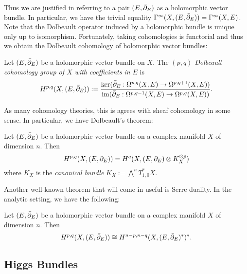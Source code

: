 \documentclass[12pt]{ociamthesis}  %
\begin{document}
Thus we are justified in referring to a pair $(E,{\bar{\partial}}_E)$ as a
holomorphic vector bundle. In particular, we have the trivial
equality $\Gamma^\infty(X,(E,{\bar{\partial}}_E)) = \Gamma^\infty(X,E)$.
Note that the Dolbeault operator induced by a holomorphic bundle is
unique only up to isomorphism. Fortunately, taking cohomologies
is functorial and thus we obtain the Dolbeault cohomology of
holomorphic vector bundles:

\begin{definition}
  Let $(E,{\bar{\partial}}_E)$ be a holomorphic vector bundle on $X$. The
  \emph{$(p,q)$ Dolbeault cohomology group of $X$ with coefficients in
    $E$} is
  \begin{align*}
    H^{p,q}(X,(E,{\bar{\partial}}_E)) := \frac{
      \ker({\bar{\partial}}_E : \Omega^{p,q}(X,E) \to \Omega^{p,q+1}(X,E))
    }{
      \operatorname{im}({\bar{\partial}}_E : \Omega^{p,q-1}(X,E) \to \Omega^{p,q}(X,E))
    }.
  \end{align*}
\end{definition}

As many cohomology theories, this is agrees with sheaf cohomology
in some sense. In particular, we have Dolbeault's theorem:

\begin{theorem}[Dolbeault]\label{thm:dolbeault}
  Let $(E,{\bar{\partial}}_E)$ be a holomorphic vector bundle on a complex manifold
  $X$ of dimension $n$. Then
  \begin{align*}
    H^{p,q}(X,(E,{\bar{\partial}}_E)) = H^q(X,(E,{\bar{\partial}}_E)\otimes K^{\otimes p}_X)
  \end{align*}
  where $K_X$ is the \emph{canonical bundle}
  $K_X := \bigwedge^n T_{1,0}^* X$.
\end{theorem}

Another well-known theorem that will come in useful is Serre duality.
In the analytic setting, we have the following:

\begin{theorem}\label{thm:serre_duality}
  Let $(E,{\bar{\partial}}_E)$ be a holomorphic vector bundle on a complex manifold
  $X$ of dimension $n$. Then
  \begin{align*}
    H^{p,q}(X,(E,{\bar{\partial}}_E)) \cong
    H^{n-p,n-q}(X,(E,{\bar{\partial}}_E)^*)^*.
  \end{align*}
\end{theorem}

\subsection{Higgs Bundles}
\end{document}
